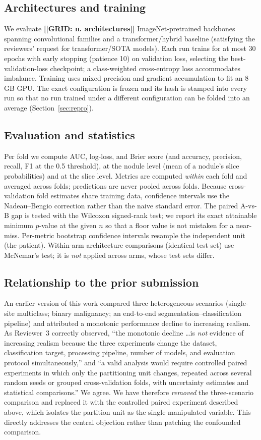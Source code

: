 \documentclass{article}
\newcommand{\gridnum}[1]{{\color{red}\textbf{[[GRID: #1]]}}}
\newcommand{\vcite}[1]{\cite{#1}}
\begin{document}
\subsection{Architectures and training}
We evaluate \gridnum{n. architectures} ImageNet-pretrained backbones spanning convolutional
families and a transformer/hybrid baseline (satisfying the reviewers' request for
transformer/SOTA models). Each run trains for at most 30 epochs with early stopping (patience 10)
on validation loss, selecting the best-validation-loss checkpoint; a class-weighted cross-entropy
loss accommodates imbalance. Training uses mixed precision and gradient accumulation to fit an
8\,GB GPU. The exact configuration is frozen and its hash is stamped into every run so that no run
trained under a different configuration can be folded into an average (Section~\ref{sec:repro}).

\subsection{Evaluation and statistics}
Per fold we compute AUC, log-loss, and Brier score (and accuracy, precision, recall, F1 at the
0.5 threshold), at the nodule level (mean of a nodule's slice probabilities) and at the slice
level. Metrics are computed \emph{within} each fold and averaged across folds; predictions are
never pooled across folds. Because cross-validation fold estimates share training data, confidence
intervals use the Nadeau--Bengio correction \vcite{nadeau2003} rather than the naive standard
error. The paired A-vs-B gap is tested with the Wilcoxon signed-rank test; we report its exact
attainable minimum $p$-value at the given $n$ so that a floor value is not mistaken for a
near-miss. Per-metric bootstrap confidence intervals resample the independent unit (the patient).
Within-arm architecture comparisons (identical test set) use McNemar's test; it is \emph{not}
applied across arms, whose test sets differ.

\subsection{Relationship to the prior submission}
An earlier version of this work compared three heterogeneous scenarios (single-site multiclass;
binary malignancy; an end-to-end segmentation--classification pipeline) and attributed a monotonic
performance decline to increasing realism. As Reviewer~3 correctly observed, ``the monotonic
decline \ldots is \emph{not} evidence of increasing realism because the three experiments change
the dataset, classification target, processing pipeline, number of models, and evaluation protocol
simultaneously,'' and ``a valid analysis would require controlled paired experiments in which only
the partitioning unit changes, repeated across several random seeds or grouped cross-validation
folds, with uncertainty estimates and statistical comparisons.'' We agree. We have therefore
\emph{removed} the three-scenario comparison and replaced it with the controlled paired experiment
described above, which isolates the partition unit as the single manipulated variable. This
directly addresses the central objection rather than patching the confounded comparison.
\end{document}
